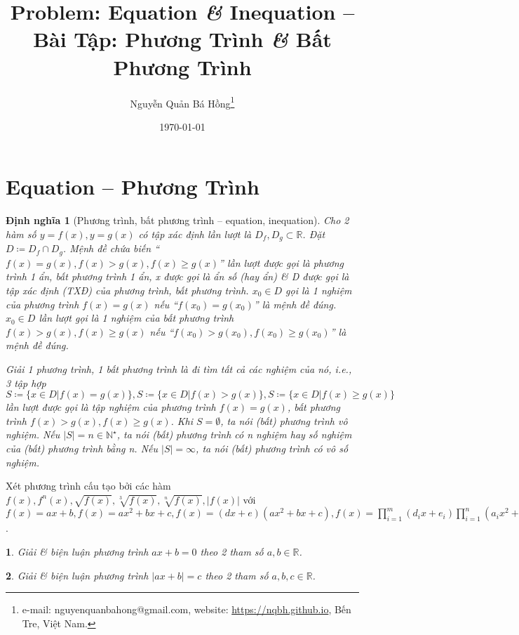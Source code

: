\documentclass{article}
\title{Problem: Equation {\it\&} Inequation -- Bài Tập: Phương Trình {\it\&} Bất Phương Trình}
\author{Nguyễn Quản Bá Hồng\footnote{e-mail: {\sf nguyenquanbahong@gmail.com}, website: \url{https://nqbh.github.io}, Bến Tre, Việt Nam.}}
\date{\today}
\newtheorem{baitoan}{}
\newtheorem{dinhnghia}{Định nghĩa}
\begin{document}
\maketitle
\tableofcontents


\section{Equation -- Phương Trình}

\begin{dinhnghia}[Phương trình, bất phương trình -- equation, inequation]
	Cho 2 hàm số $y = f(x),y = g(x)$ có tập xác định lần lượt là $D_f,D_g\subset\mathbb{R}$. Đặt $D\coloneqq D_f\cap D_g$. Mệnh đề chứa biến ``$f(x) = g(x),f(x) > g(x),f(x)\ge g(x)$'' lần lượt được gọi là {\rm phương trình 1 ẩn, bất phương trình 1 ẩn}, x được gọi là {\rm ẩn số} (hay {\rm ẩn}) \& D được gọi là {\rm tập xác định (TXĐ)} của phương trình, bất phương trình. $x_0\in D$ gọi là 1 {\rm nghiệm} của phương trình $f(x) = g(x)$ nếu ``$f(x_0) = g(x_0)$'' là mệnh đề đúng. $x_0\in D$ lần lượt gọi là 1 {\rm nghiệm} của bất phương trình $f(x) > g(x),f(x)\ge g(x)$ nếu ``$f(x_0) > g(x_0),f(x_0)\ge g(x_0)$'' là mệnh đề đúng.
	
	{\rm Giải} 1 phương trình, 1 bất phương trình là đi tìm tất cả các nghiệm của nó, i.e., 3 tập hợp $S\coloneqq\{x\in D|f(x) = g(x)\},S\coloneqq\{x\in D|f(x) > g(x)\},S\coloneqq\{x\in D|f(x)\ge g(x)\}$ lần lượt được gọi là {\rm tập nghiệm} của phương trình $f(x) = g(x)$, bất phương trình $f(x) > g(x),f(x)\ge g(x)$. Khi $S = \emptyset$, ta nói (bất) phương trình {\rm vô nghiệm}. Nếu $|S| = n\in\mathbb{N}^\star$, ta nói (bất) phương trình có n nghiệm hay số nghiệm của (bất) phương trình bằng n. Nếu $|S| = \infty$, ta nói (bất) phương trình có vô số nghiệm.
\end{dinhnghia}
Xét phương trình cấu tạo bởi các hàm $f(x),f^n(x),\sqrt{f(x)},\sqrt[3]{f(x)},\sqrt[n]{f(x)},|f(x)|$ với $f(x) = ax + b,f(x) = ax^2 + bx + c,f(x) = (dx + e)(ax^2 + bx + c),f(x) = \prod_{i=1}^m (d_ix + e_i)\prod_{i=1}^n (a_ix^2 + b_ix + c_i)$.

\begin{baitoan}
	Giải \& biện luận phương trình $ax + b = 0$ theo 2 tham số $a,b\in\mathbb{R}$.
\end{baitoan}

\begin{baitoan}
	Giải \& biện luận phương trình $|ax + b| = c$ theo 2 tham số $a,b,c\in\mathbb{R}$.
\end{baitoan}
\end{document}
